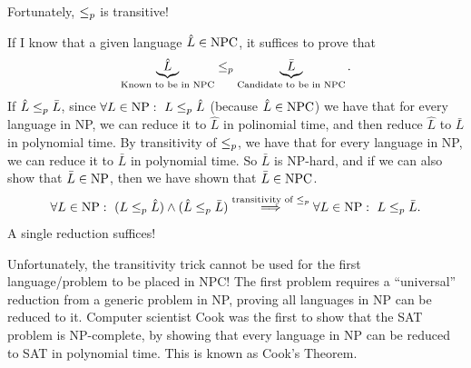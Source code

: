 Fortunately, $\leq_p$ is transitive!

If I know that a given language $\hat L\in\mathrm{NPC}$, it suffices to prove that
\[
\underbrace{\hat L}_{\text{Known to be in NPC}}\leq_p
\underbrace{\bar L}_{\text{Candidate to be in NPC}}.
\]
If $\hat L\leq_p\bar L$, since $\forall L\in\mathrm{NP}:\ L\leq_p\hat L$ (because $\hat L\in\mathrm{NPC}$) we have that for every language in NP, we can reduce it to $\hat L$ in polinomial time, and then reduce $\hat L$ to $\bar L$ in polynomial time. By transitivity of $\leq_p$, we have that for every language in NP, we can reduce it to $\bar L$ in polynomial time. So $\bar L$ is NP-hard, and if we can also show that $\bar L\in\mathrm{NP}$, then we have shown that $\bar L\in\mathrm{NPC}$.
\[
\forall L\in\classNP:\ (L\polyred\hat L)\land(\hat L\polyred\bar L)
\xRightarrow{\text{transitivity of }\polyred}\forall L\in\classNP:\ L\polyred\bar L.
\]
A single reduction suffices!

Unfortunately, the transitivity trick cannot be used for the first language/problem to be placed in NPC!
The first problem requires a ``universal'' reduction from a generic problem in NP, proving all languages in NP can be reduced to it. Computer scientist Cook was the first to show that the SAT problem is NP-complete, by showing that every language in NP can be reduced to SAT in polynomial time. This is known as Cook's Theorem.